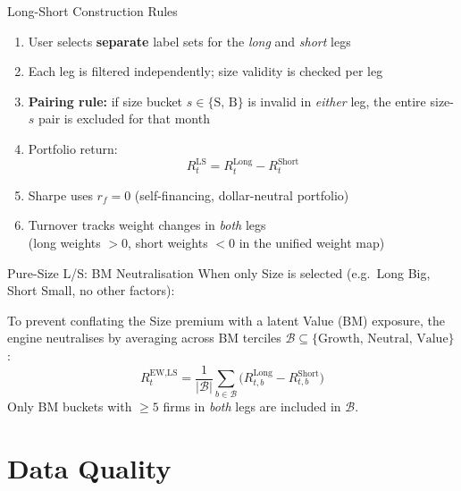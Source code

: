 \documentclass[aspectratio=169, 12pt]{beamer}
\begin{document}
\begin{frame}{Long-Short Construction Rules}
  \begin{enumerate}
    \item User selects \textbf{separate} label sets for the \textit{long} and \textit{short} legs
    \item Each leg is filtered independently; size validity is checked per leg
    \item \textbf{Pairing rule:} if size bucket $s \in \{\text{S, B}\}$ is invalid in \emph{either} leg, the entire size-$s$ pair is excluded for that month
    \item Portfolio return:
    \[
      R_t^{\text{LS}} = R_t^{\text{Long}} - R_t^{\text{Short}}
    \]
    \item Sharpe uses $r_f = 0$ (self-financing, dollar-neutral portfolio)
    \item Turnover tracks weight changes in \emph{both} legs\\(long weights $> 0$, short weights $< 0$ in the unified weight map)
  \end{enumerate}
\end{frame}

\begin{frame}{Pure-Size L/S: BM Neutralisation}
  When only Size is selected (e.g.\ Long Big, Short Small, no other factors):

  \medskip
  To prevent conflating the Size premium with a latent Value (BM) exposure,
  the engine neutralises by averaging across BM terciles
  $\mathcal{B} \subseteq \{\text{Growth, Neutral, Value}\}$:
  \[
    R_t^{\text{EW,LS}} = \frac{1}{|\mathcal{B}|}\sum_{b\in\mathcal{B}}
      \bigl(R_{t,b}^{\text{Long}} - R_{t,b}^{\text{Short}}\bigr)
  \]
  Only BM buckets with $\geq 5$ firms in \emph{both} legs are included in $\mathcal{B}$.
\end{frame}

\section{Data Quality}
\end{document}
